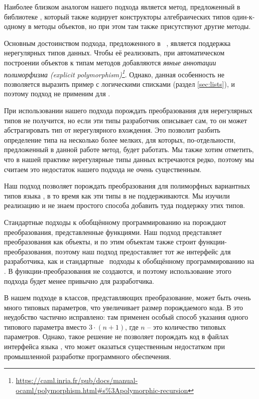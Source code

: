 Наиболее близком аналогом нашего подхода является метод, предложенный в библиотеке \visitors{}, который также кодирует конструкторы алгебраических типов один-к-одному в методы объектов, но при этом там также присутствуют другие методы.

Основным достоинством подхода, предложенного в \visitors{}~\cite{Visitors}, является поддержка нерегулярных типов данных. Чтобы её реализовать, при автоматическом построении объектов к типам методов добавляются \emph{явные аннотации полиморфизма (explicit polymorphism)\footnote{\url{https://caml.inria.fr/pub/docs/manual-ocaml/polymorphism.html\#s\%3Apolymorphic-recursion}}}. Однако, данная особенность не позволяется выразить пример с логическими списками (раздел \ref{sec:lists}), и поэтому подход \visitors{} не применим для \OCanren{}.

При использовании нашего подхода порождать преобразования для нерегулярных типов не получится, но если эти типы разработчик описывает сам, то он может абстрагировать тип от нерегулярного вхождения. Это позволит разбить определение типа на несколько более мелких, для которых, по-отдельности, предложенный в данной работе метод, будет работать. Мы также хотим отметить, что в нашей практике нерегулярные типы данных встречаются редко, поэтому мы считаем это недостаток нашего подхода не очень существенным.

Наш подход позволяет порождать преобразования для полиморфных вариантных типов языка \ocaml{}, в то время как эти типы в \visitors{} не поддерживаются. Мы изучили реализацию \visitors{} и не знаем простого способа добавить туда поддержку этих типов.

Стандартные подходы к обобщённому программированию на \ocaml{} порождают преобразования, представленные функциями. Наш подход представляет преобразования как объекты, и по этим объектам также строит функции-преобразования, поэтому наш подход предоставляет тот же интерфейс для разработчика, как и стандартные~\cite{PPXLib,ppxderiving} подходы к обобщённому программированию на \ocaml{}. В \visitors{} функции-преобразования не создаются, и поэтому использование этого подхода будет менее привычно для разработчика.

В нашем подходе в классов, представляющих преобразование, может быть очень много типовых параметров, что увеличивает размер порождаемого кода. В \visitors{} это неудобство частично исправлено: там применен особый способ указания одного типового параметра вместо $3\cdot(n+1)$, где $n$ -- это количество типовых параметров. Однако, такое решение не позволяет порождать код в файлах интерфейса языка \ocaml{}, что может оказаться существенным недостатком при промышленной разработке программного обеспечения.


